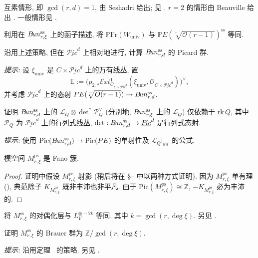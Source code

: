 \begin{remark}\label{src:9.4.39}
互素情形, 即 $\gcd(r,d)=1$, 由 Seshadri 给出; 见 \cite[命题 3.4]{NR69}. $r=2$ 的情形由 Beauville 给出 \cite[定理 1]{Bea88}. 一般情形见 \cite[定理 B 和 C]{DN89}.
\end{remark}
\begin{exercise}\label{src:9.4.40}
利用在 $B\!un_{r,\xi}^{\mathrm{ss}}$ 上的函子描述, 将 $\mathbb P\mathrm{Fr}(W_{\mathrm{univ}})$ 与 $\mathbb PE(\sqrt[r]{\mathcal O(r-1)})^{\mathrm{ss}}$ 等同.
\end{exercise}
\begin{exercise}\label{src:9.4.41}
沿用上述策略, 但在 $\underline{\mathcal P\!ic}^d$ 上相对地进行, 计算 $B\!un_{r,d}^{\mathrm{ss}}$ 的 Picard 群.

\textit{提示:} 设 $\xi_{\mathrm{univ}}$ 是 $C\times\underline{\mathcal P\!ic}^d$ 上的万有线丛, 置
\[
\mathbb E:=\big(p_{2,*}\mathcal E\!xt^1_{\mathcal O_{C\times\underline{\mathcal P\!ic}^d}}(\xi_{\mathrm{univ}},\mathcal O_{C\times\underline{\mathcal P\!ic}^d})\big)^\vee,
\]
并考虑 $\underline{\mathcal P\!ic}^d$ 上的态射 $PE(\sqrt[r]{O(r-1)})\to B\!un_{r,d}^{\mathrm{ss}}$.
\end{exercise}
\begin{exercise}\label{src:9.4.42}
证明 $B\!un_{r,d}^{\mathrm{ss}}$ 上的 $\mathcal L_Q\otimes\det^*\mathcal P_Q^\vee$ (分别地, $B\!un_{r,\xi}^{\mathrm{ss}}$ 上的 $\mathcal L_Q$) 仅依赖于 $\mathrm{rk}\,Q$, 其中 $\mathcal P_Q$ 为 $\underline{\mathcal P\!ic}^d$ 上的行列式线丛, $\det:B\!un_{r,d}^{\mathrm{ss}}\to\underline{P\!ic}^d$ 是行列式态射.

\textit{提示:} 使用 $\mathrm{Pic}(B\!un_{r,d}^{\mathrm{ss}})\to\mathrm{Pic}(PE)$ 的单射性及 $\mathcal L_Q|_{\mathbb P\mathbb E}$ 的公式.
\end{exercise}
\begin{corollary}\label{src:9.4.43}
模空间 $M_{r,\xi}^{\mathrm{ps}}$ 是 Fano 簇.
\end{corollary}
\begin{proof}
证明中假设 $M_{r,\xi}^{\mathrm{ps}}$ 射影 (稍后将在 \S{}-- 中以两种方式证明). 因为 $M_{r,\xi}^{\mathrm{ps}}$ 单有理 (), 典范除子 $K_{M_{r,\xi}^{\mathrm{ps}}}$ 既非丰沛也非平凡. 由于 $\mathrm{Pic}(M_{r,\xi}^{\mathrm{ps}})\cong\mathbb Z$, $-K_{M_{r,\xi}^{\mathrm{ps}}}$ 必为丰沛的.
\end{proof}
\begin{exercise}\label{src:9.4.44}
将 $M_{r,\xi}^{\mathrm{ss}}$ 的对偶化层与 $L_V^{\otimes-2k}$ 等同, 其中 $k=\gcd(r,\deg\xi)$. 另见 \cite[定理 F]{DN89}.
\end{exercise}
\begin{exercise}[难]\label{src:9.4.45}
证明 $M_{r,\xi}^{\mathrm{ss}}$ 的 Brauer 群为 $\mathbb Z/\gcd(r,\deg\xi)$.

\textit{提示:} 沿用定理~ 的策略. 另见 \cite[定理 1.8]{BBGN07}.
\end{exercise}
